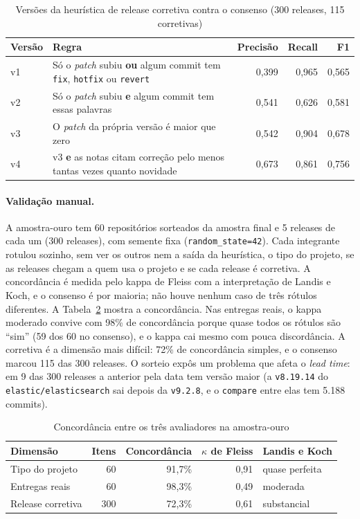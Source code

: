 \documentclass[12pt]{article}
\begin{document}
\begin{table}[ht]
\centering
\caption{Versões da heurística de release corretiva contra o consenso (300 releases, 115 corretivas)}
\label{tab:heuristica}
\small
\begin{tabular}{lp{8.2cm}rrr}
\hline
Versão & Regra & Precisão & Recall & F1 \\
\hline
v1 & Só o \textit{patch} subiu \textbf{ou} algum commit tem \texttt{fix}, \texttt{hotfix} ou
\texttt{revert} & 0,399 & 0,965 & 0,565 \\
v2 & Só o \textit{patch} subiu \textbf{e} algum commit tem essas palavras & 0,541 & 0,626 & 0,581 \\
v3 & O \textit{patch} da própria versão é maior que zero & 0,542 & 0,904 & 0,678 \\
v4 & v3 \textbf{e} as notas citam correção pelo menos tantas vezes quanto novidade & 0,673 & 0,861
& 0,756 \\
\hline
\end{tabular}
\end{table}

\paragraph{Validação manual.} A amostra-ouro tem 60 repositórios sorteados da amostra final e 5
releases de cada um (300 releases), com semente fixa (\texttt{random\_state=42}). Cada integrante
rotulou sozinho, sem ver os outros nem a saída da heurística, o tipo do projeto, se as releases chegam
a quem usa o projeto e se cada release é corretiva. A concordância é medida pelo kappa de Fleiss com a
interpretação de Landis e Koch, e o consenso é por maioria; não houve nenhum caso de três rótulos
diferentes. A Tabela~\ref{tab:kappa} mostra a concordância. Nas entregas reais, o kappa moderado
convive com 98\% de concordância porque quase todos os rótulos são ``sim'' (59 dos 60 no consenso), e
o kappa cai mesmo com pouca discordância. A corretiva é a dimensão mais difícil: 72\% de concordância
simples, e o consenso marcou 115 das 300 releases. O sorteio expôs um problema que afeta o \textit{lead time}: em 9 das 300 releases a anterior
pela data tem versão maior (a \texttt{v8.19.14} do \texttt{elastic/elasticsearch} sai depois da
\texttt{v9.2.8}, e o \texttt{compare} entre elas tem 5.188 commits).

\begin{table}[ht]
\centering
\caption{Concordância entre os três avaliadores na amostra-ouro}
\label{tab:kappa}
\small
\begin{tabular}{lrrrl}
\hline
Dimensão & Itens & Concordância & $\kappa$ de Fleiss & Landis e Koch \\
\hline
Tipo do projeto & 60 & 91,7\% & 0,91 & quase perfeita \\
Entregas reais & 60 & 98,3\% & 0,49 & moderada \\
Release corretiva & 300 & 72,3\% & 0,61 & substancial \\
\hline
\end{tabular}
\end{table}
\end{document}
